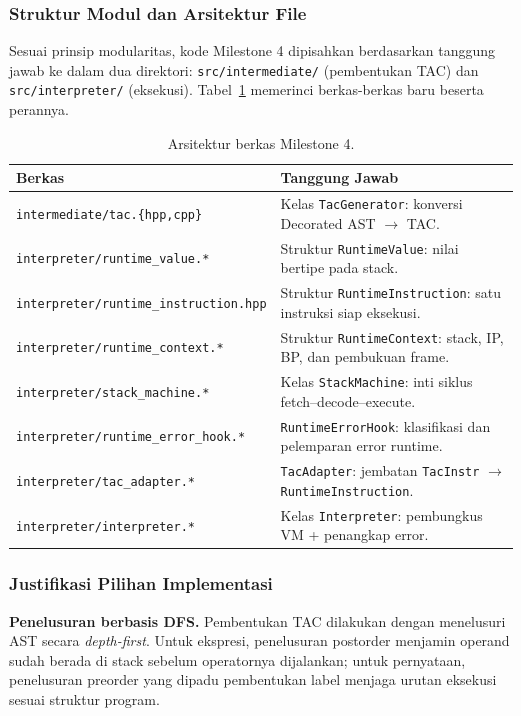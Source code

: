 \subsubsection{Struktur Modul dan Arsitektur File}

Sesuai prinsip modularitas, kode Milestone 4 dipisahkan berdasarkan tanggung
jawab ke dalam dua direktori: \texttt{src/intermediate/} (pembentukan TAC) dan
\texttt{src/interpreter/} (eksekusi). Tabel~\ref{tab:file} memerinci berkas-berkas
baru beserta perannya.

\begin{table}[H]
\centering
\caption{Arsitektur berkas Milestone 4.}
\label{tab:file}
\renewcommand{\arraystretch}{1.2}
\begin{tabularx}{\textwidth}{@{}l X@{}}
\toprule
\textbf{Berkas} & \textbf{Tanggung Jawab} \\
\midrule
\texttt{intermediate/tac.\{hpp,cpp\}}     & Kelas \texttt{TacGenerator}: konversi Decorated AST $\rightarrow$ TAC. \\
\texttt{interpreter/runtime\_value.*}      & Struktur \texttt{RuntimeValue}: nilai bertipe pada stack. \\
\texttt{interpreter/runtime\_instruction.hpp} & Struktur \texttt{RuntimeInstruction}: satu instruksi siap eksekusi. \\
\texttt{interpreter/runtime\_context.*}    & Struktur \texttt{RuntimeContext}: stack, IP, BP, dan pembukuan frame. \\
\texttt{interpreter/stack\_machine.*}      & Kelas \texttt{StackMachine}: inti siklus fetch--decode--execute. \\
\texttt{interpreter/runtime\_error\_hook.*}& \texttt{RuntimeErrorHook}: klasifikasi dan pelemparan error runtime. \\
\texttt{interpreter/tac\_adapter.*}        & \texttt{TacAdapter}: jembatan \texttt{TacInstr} $\rightarrow$ \texttt{RuntimeInstruction}. \\
\texttt{interpreter/interpreter.*}         & Kelas \texttt{Interpreter}: pembungkus VM + penangkap error. \\
\bottomrule
\end{tabularx}
\end{table}

\subsubsection{Justifikasi Pilihan Implementasi}

\textbf{Penelusuran berbasis DFS.} Pembentukan TAC dilakukan dengan menelusuri AST
secara \emph{depth-first}. Untuk ekspresi, penelusuran postorder menjamin operand
sudah berada di stack sebelum operatornya dijalankan; untuk pernyataan,
penelusuran preorder yang dipadu pembentukan label menjaga urutan eksekusi sesuai
struktur program.

